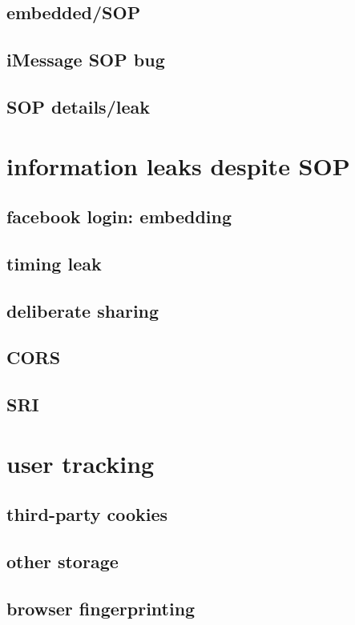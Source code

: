 \subsection{embedded/SOP}


\subsection{iMessage SOP bug}


\subsection{SOP details/leak}


\section{information leaks despite SOP}

\subsection{facebook login: embedding}


\subsection{timing leak}



\subsection{deliberate sharing}


\subsection{CORS}

\subsection{SRI}


\section{user tracking}


\subsection{third-party cookies}



\subsection{other storage}


\subsection{browser fingerprinting}


%
